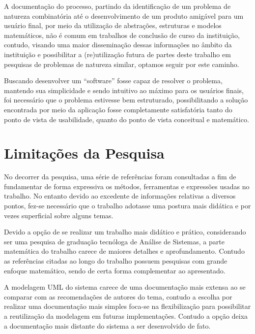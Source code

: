 
A documentação do processo, partindo da identificação de um problema de natureza combinatória até o desenvolvimento de um produto amigável para um usuário final, por meio da utilização de abstrações, estruturas e modelos matemáticos, não é comum em trabalhos de conclusão de curso da instituição, contudo, visando uma maior disseminação dessas informações no âmbito da instituição e possibilitar a (re)utilização futura de partes deste trabalho em pesquisas de problemas de natureza similar, optamos seguir por este caminho.


Buscando desenvolver um “software” fosse capaz de resolver o problema, mantendo sua simplicidade e sendo intuitivo ao máximo para os usuários finais, foi necessário que o problema estivesse bem estruturado, possibilitando a solução encontrada por meio da aplicação fosse completamente satisfatória tanto do ponto de vista de usabilidade, quanto do ponto de vista conceitual e matemático.


\section{Limitações da Pesquisa}

No decorrer da pesquisa, uma série de referências foram consultadas a fim de fundamentar de forma expressiva os métodos, ferramentas e expressões usadas no trabalho. No entanto devido ao excedente de informações relativas a diversos pontos, fez-se necessário que o trabalho adotasse uma postura mais didática e por vezes superficial sobre alguns temas.

Devido a opção de se realizar um trabalho mais didático e prático, considerando ser uma pesquisa de graduação tecnóloga de Análise de Sistemas, a parte matemática do trabalho carece de maiores detalhes e aprofundamento. Contudo as referências citadas ao longo do trabalho possuem pesquisas com grande enfoque matemático, sendo de certa forma complementar ao apresentado.

A modelagem UML do sistema carece de uma documentação mais extensa ao se comparar com as recomendações de autores do tema, contudo a escolha por realizar uma documentação mais simples foca-se na flexibilização para possibilitar a reutilização da modelagem em futuras implementações. Contudo a opção deixa a documentação mais distante do sistema a ser desenvolvido de fato.

